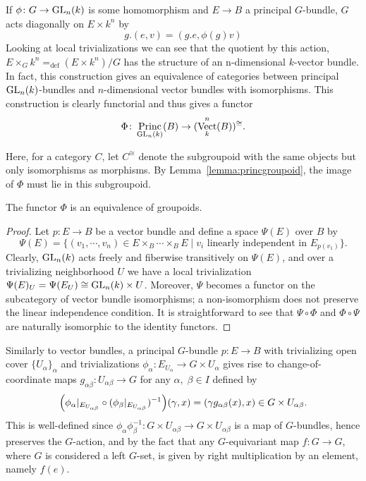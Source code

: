 \documentclass[a4paper,openany]{scrbook}
\DeclareMathOperator{\Vect}{Vect}
\DeclareMathOperator{\Princ}{Princ}
\begin{document}
If $\phi\colon G \to \operatorname{GL}_n(k)$ is some homomorphism and $E \to B$ a principal $G$-bundle, $G$ acts diagonally on $E 
\times k^n$ by
\[
g.(e,v) = (g.e,\phi(g)v)
\] 
Looking at local trivializations we can see that the quotient by this action, $E \times_G k^n =_{\text{def}} (E\times k^n)/G$ has the structure of an n-dimensional $k$-vector bundle. In fact, this construction gives an equivalence of categories between principal $\operatorname{GL}_n(k)$-bundles and $n$-dimensional vector bundles with isomorphisms. This construction is clearly functorial and thus gives a functor
\[
\Phi\colon \Princ_{\GL_n(k)}(B) \to (\Vect^n_k(B))^{\cong}.
\]

Here, for a category $C$, let $C^{\cong}$ denote the subgroupoid with the same objects but only isomorphisms as morphisms. By Lemma~\ref{lemma:princgroupoid}, the image of $\Phi$ must lie in this subgroupoid.

\begin{prop}
The functor $\Phi$ is an equivalence of groupoids.
\end{prop}
\begin{proof}
Let $p\colon E \to B$ be a vector bundle and define a space $\Psi(E)$ over $B$ by
\[
\Psi(E) = \{(v_1,\cdots,v_n) \in E \times_B \cdots \times_B E \mid v_i \text{ linearly independent in $E_{p(v_1)}$}\}.
\]
Clearly, $\operatorname{GL}_n(k)$ acts freely and fiberwise transitively on $\Psi(E)$, and over a trivializing neighborhood $U$ we have a local trivialization $\Psi(E)_U = \Psi(E_U) \cong \operatorname{GL}_n(k) \times U$. Moreover, $\Psi$ becomes a functor on the subcategory of vector bundle isomorphisms; a non-isomorphism does not preserve the linear independence condition. It is straightforward to see that $\Psi\circ\Phi$ and $\Phi\circ\Psi$ are naturally isomorphic to the identity functors.
\end{proof}

Similarly to vector bundles, a principal $G$-bundle $p\colon E \to B$ with trivializing open cover $\{U_\alpha\}_{\alpha}$ and trivializations $\phi_\alpha\colon E_{U_{\alpha}} \to G \times U_{\alpha}$ gives rise to change-of-coordinate maps $g_{\alpha\beta}\colon U_{\alpha\beta} \to G$ for any $\alpha,\;\beta \in I$ defined by
\[
\Bigl(\phi_\alpha|_{E_{U_{\alpha\beta}}} \circ (\phi_\beta|_{E_{U_{\alpha\beta}}})^{-1}\Bigr)(\gamma,x) = (\gamma g_{\alpha\beta}(x),x)\in G \times U_{\alpha\beta}.
\]
This is well-defined since $\phi_\alpha\phi_\beta^{-1}\colon G \times U_{\alpha \beta}  \to G \times U_{\alpha \beta}$ is a map of $G$-bundles, hence preserves the $G$-action, and by the fact that any $G$-equivariant map $f\colon G \to G$, where $G$ is considered a left $G$-set, is given by right multiplication by an element, namely $f(e)$.
\end{document}
